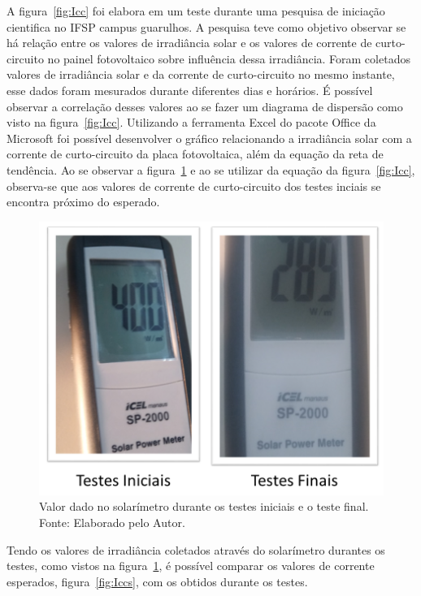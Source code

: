 A figura~\ref{fig:Icc} foi elabora em um teste durante uma pesquisa de iniciação cientifica no IFSP campus guarulhos. A pesquisa teve como objetivo observar se há relação entre os valores de irradiância solar e os valores de corrente de curto-circuito no painel fotovoltaico sobre influência dessa irradiância. Foram coletados valores de irradiância solar e da corrente de curto-circuito no mesmo instante, esse dados foram mesurados durante diferentes dias e horários. É possível observar a correlação desses valores ao se fazer um diagrama de dispersão como visto na figura~\ref{fig:Icc}. Utilizando a ferramenta Excel do pacote Office da Microsoft foi possível desenvolver o gráfico relacionando a irradiância solar com a corrente de curto-circuito da placa fotovoltaica, além da equação da reta de tendência.
Ao se observar a figura~\ref{fig:irrad} e ao se utilizar da equação da figura~\ref{fig:Icc}, observa-se que aos valores de corrente de curto-circuito dos testes inciais se encontra próximo do esperado.

\FloatBarrier
\begin{figure}[!htbp]
	\centering
	\includegraphics[scale=0.55]{imagens/irrad.png}
	\caption{Valor dado no solarímetro durante os testes iniciais e o teste final. Fonte: Elaborado pelo Autor. 	}
	\label{fig:irrad}
\end{figure}
\FloatBarrier

Tendo os valores de irradiância coletados através do solarímetro durantes os testes, como vistos na figura~\ref{fig:irrad}, é possível comparar os valores de corrente esperados, figura~\ref{fig:Iccs}, com os obtidos durante os testes.

